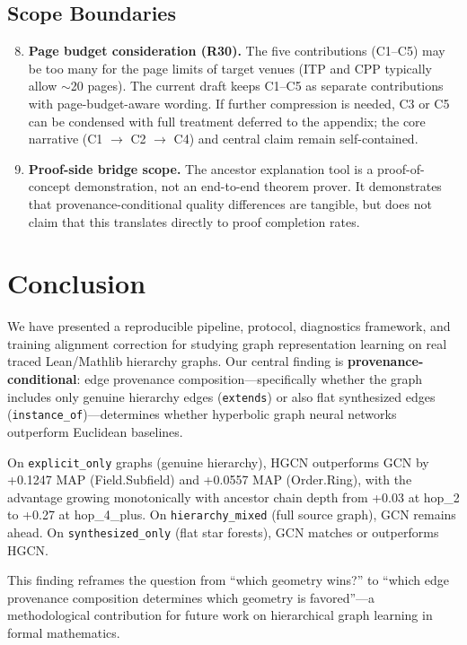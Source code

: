 \documentclass[runningheads]{llncs}
\newcommand{\enquote}[1]{``#1''}
\begin{document}
\subsection{Scope Boundaries}

\begin{enumerate}\setcounter{enumi}{7}
\item \textbf{Page budget consideration (R30).} The five contributions (C1--C5) may be too many for the page limits of target venues (ITP and CPP typically allow $\sim$20 pages). The current draft keeps C1--C5 as separate contributions with page-budget-aware wording. If further compression is needed, C3 or C5 can be condensed with full treatment deferred to the appendix; the core narrative (C1 $\to$ C2 $\to$ C4) and central claim remain self-contained.

\item \textbf{Proof-side bridge scope.} The ancestor explanation tool is a proof-of-concept demonstration, not an end-to-end theorem prover. It demonstrates that provenance-conditional quality differences are tangible, but does not claim that this translates directly to proof completion rates.
\end{enumerate}

\section{Conclusion}

We have presented a reproducible pipeline, protocol, diagnostics framework, and training alignment correction for studying graph representation learning on real traced Lean/Mathlib hierarchy graphs. Our central finding is \textbf{provenance-conditional}: edge provenance composition---specifically whether the graph includes only genuine hierarchy edges (\texttt{extends}) or also flat synthesized edges (\texttt{instance\_of})---determines whether hyperbolic graph neural networks outperform Euclidean baselines.

On \texttt{explicit\_only} graphs (genuine hierarchy), HGCN outperforms GCN by +0.1247 MAP (Field.Subfield) and +0.0557 MAP (Order.Ring), with the advantage growing monotonically with ancestor chain depth from +0.03 at hop\_2 to +0.27 at hop\_4\_plus. On \texttt{hierarchy\_mixed} (full source graph), GCN remains ahead. On \texttt{synthesized\_only} (flat star forests), GCN matches or outperforms HGCN.

This finding reframes the question from \enquote{which geometry wins?} to \enquote{which edge provenance composition determines which geometry is favored}---a methodological contribution for future work on hierarchical graph learning in formal mathematics.
\end{document}
